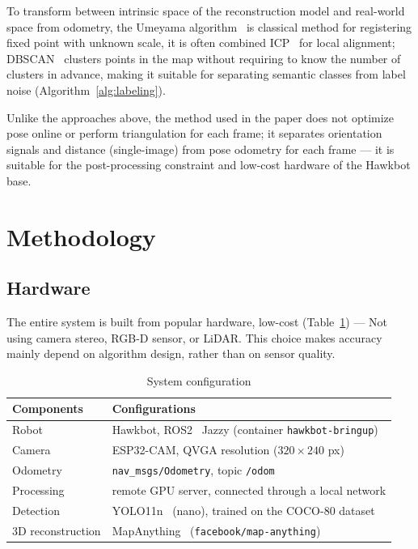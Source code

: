 \documentclass[conference]{IEEEtran}
\begin{document}
To transform between intrinsic space of the reconstruction model and real-world space from odometry, the Umeyama algorithm~\cite{88573} is classical method for registering fixed point with unknown scale, it is often combined ICP~\cite{121791} for local alignment; DBSCAN~\cite{dbscan} clusters points in the map without requiring to know the number of clusters in advance, making it suitable for separating semantic classes from label noise (Algorithm~\ref{alg:labeling}).

Unlike the approaches above, the method used in the paper does not optimize pose online or perform triangulation for each frame; it separates orientation signals and distance (single-image) from pose odometry for each frame — it is suitable for the post-processing constraint and low-cost hardware of the Hawkbot base.

\section{Methodology}

\subsection{Hardware}

The entire system is built from popular hardware, low-cost (Table~\ref{tab:hw-specs}) — Not using camera stereo, RGB-D sensor, or LiDAR. This choice makes accuracy mainly depend on algorithm design, rather than on sensor quality.

\begin{table}[t]
\centering
\small
\caption{System configuration}
\label{tab:hw-specs}
\begin{tabular}{@{}p{1.7cm}p{5.4cm}@{}}
\toprule
\textbf{Components} & \textbf{Configurations} \\
\midrule
Robot & Hawkbot, ROS2~\cite{ros} Jazzy (container \texttt{hawkbot-bringup}) \\
Camera & ESP32-CAM, QVGA resolution ($320\times240$ px) \\
Odometry & \texttt{nav\_msgs/Odometry}, topic \texttt{/odom} \\
Processing & remote GPU server, connected through a local network \\
Detection & YOLO11n~\cite{7780460,yolo11} (nano), trained on the COCO-80 dataset \\
3D reconstruction & MapAnything~\cite{mapanything} (\texttt{facebook/map-anything}) \\
\bottomrule
\end{tabular}
\end{table}
\end{document}
